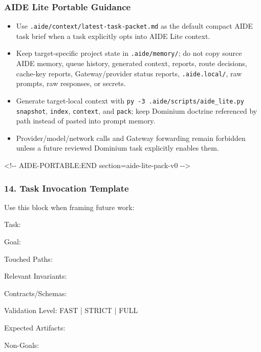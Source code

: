 \documentclass[9pt,a4paper,openany]{book}
\newcommand{\vonecode}[1]{\par\smallskip\noindent\begingroup\setlength{\fboxsep}{7pt}\colorbox{DomCodeBg}{\parbox{0.94\linewidth}{\footnotesize\ttfamily #1}}\endgroup\par\smallskip}
\begin{document}
\subsubsection{AIDE Lite Portable Guidance}

\begin{itemize}
\item Use \texttt{.\allowbreak{}aide/\allowbreak{}context/\allowbreak{}latest-\allowbreak{}task-\allowbreak{}packet.\allowbreak{}md} as the default compact AIDE task brief when a task explicitly opts into AIDE Lite context.\allowbreak{}
\item Keep target-\allowbreak{}specific project state in \texttt{.\allowbreak{}aide/\allowbreak{}memory/\allowbreak{}}; do not copy source AIDE memory, queue history, generated context, reports, route decisions, cache-\allowbreak{}key reports, Gateway/\allowbreak{}provider status reports, \texttt{.\allowbreak{}aide.\allowbreak{}local/\allowbreak{}}, raw prompts, raw responses, or secrets.\allowbreak{}
\item Generate target-\allowbreak{}local context with \texttt{py -\allowbreak{}3 .\allowbreak{}aide/\allowbreak{}scripts/\allowbreak{}aide\_\allowbreak{}lite.\allowbreak{}py snapshot}, \texttt{index}, \texttt{context}, and \texttt{pack}; keep Dominium doctrine referenced by path instead of pasted into prompt memory.\allowbreak{}
\item Provider/\allowbreak{}model/\allowbreak{}network calls and Gateway forwarding remain forbidden unless a future reviewed Dominium task explicitly enables them.\allowbreak{}
\end{itemize}
<!-\allowbreak{}-\allowbreak{} AIDE-\allowbreak{}PORTABLE:END section=aide-\allowbreak{}lite-\allowbreak{}pack-\allowbreak{}v0 -\allowbreak{}-\allowbreak{}>


\subsubsection{14. Task Invocation Template}

Use this block when framing future work:


\vonecode{Task:\par
Goal:\par
Touched Paths:\par
Relevant Invariants:\par
Contracts/\allowbreak{}Schemas:\par
Validation Level: FAST | STRICT | FULL\par
Expected Artifacts:\par
Non-\allowbreak{}Goals:\par}
\end{document}

